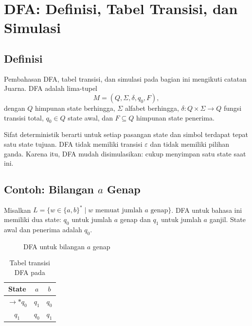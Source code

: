 \section{DFA: Definisi, Tabel Transisi, dan Simulasi}
\label{sec:ch06-dfa}

\subsection{Definisi}

\begin{definisi}
Pembahasan DFA, tabel transisi, dan simulasi pada bagian ini mengikuti
catatan Juarna. DFA adalah lima-tupel
\[
M = (Q, \Sigma, \delta, q_0, F),
\]
dengan \(Q\) himpunan state berhingga, \(\Sigma\) alfabet berhingga,
\(\delta : Q \times \Sigma \to Q\) fungsi transisi total, \(q_0 \in Q\)
state awal, dan \(F \subseteq Q\) himpunan state penerima.
\end{definisi}

Sifat deterministik berarti untuk setiap pasangan state dan simbol
terdapat tepat satu state tujuan. DFA tidak memiliki transisi
\(\varepsilon\) dan tidak memiliki pilihan ganda. Karena itu, DFA
mudah disimulasikan: cukup menyimpan satu state saat ini.

\subsection{Contoh: Bilangan \(a\) Genap}

Misalkan \(L = \{w \in \{a,b\}^{*} \mid w \text{ memuat jumlah } a
\text{ genap}\}\). DFA untuk bahasa ini memiliki dua state:
\(q_0\) untuk jumlah \(a\) genap dan \(q_1\) untuk jumlah \(a\)
ganjil. State awal dan penerima adalah \(q_0\).

\begin{figure}[H]
\centering
{}
\caption{DFA untuk bilangan \(a\) genap}
\label{fig:ch06-dfa-genap}
\end{figure}

\begin{table}[H]
\centering
\caption{Tabel transisi DFA pada }
\label{tab:ch06-dfa-genap}
\begin{tabular}{@{}c cc@{}}
\toprule
\textbf{State} & \textbf{\(a\)} & \textbf{\(b\)} \\
\midrule
\(\to *q_0\) & \(q_1\) & \(q_0\) \\
\(q_1\) & \(q_0\) & \(q_1\) \\
\bottomrule
\end{tabular}
\end{table}

